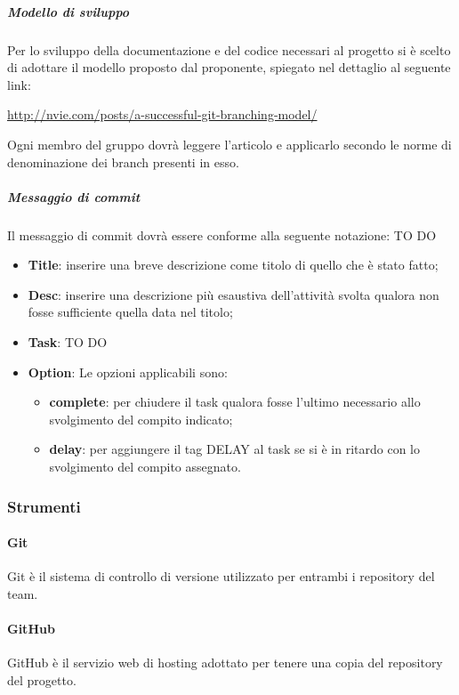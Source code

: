				\subparagraph{Modello di sviluppo}
				Per lo sviluppo della documentazione e del codice necessari al progetto si è scelto di adottare il modello proposto dal proponente, spiegato nel dettaglio al seguente link:
					\begin{center}
						\url{http://nvie.com/posts/a-successful-git-branching-model/}
					\end{center}
					Ogni membro del gruppo dovrà leggere l'articolo e applicarlo secondo le norme di denominazione dei branch presenti in esso.

				\subparagraph{Messaggio di commit} \label{sec:messaggio_di_commit}
				Il messaggio di commit dovrà essere conforme alla seguente notazione:
				TO DO
					\begin{itemize}
						\item \textbf{Title}: inserire una breve descrizione come titolo di quello che è stato fatto;
						\item \textbf{Desc}: inserire una descrizione più esaustiva dell'attività svolta qualora non fosse sufficiente quella data nel titolo;
						\item \textbf{Task}: TO DO
						\item \textbf{Option}: Le opzioni applicabili sono:
							\begin{itemize}
								\item \textbf{complete}: per chiudere il task qualora fosse l'ultimo necessario allo svolgimento del compito indicato;
								\item \textbf{delay}: per aggiungere il tag DELAY al task se si è in ritardo con lo svolgimento del compito assegnato.
							\end{itemize}
							
					\end{itemize}
					
					
					
		\subsubsection{Strumenti}
			\paragraph{Git}
			Git è il sistema di controllo di versione utilizzato per entrambi i repository del team.	
			\paragraph{GitHub}
			GitHub è il servizio web di hosting adottato per tenere una copia del repository del progetto.
